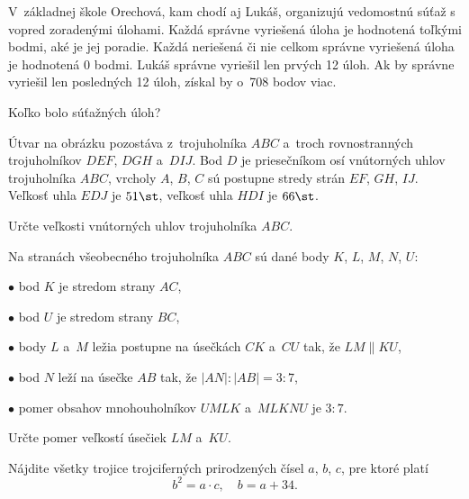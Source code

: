 {%
V~základnej škole Orechová, kam chodí aj Lukáš, organizujú vedomostnú súťaž s vopred zoradenými úlohami.
Každá správne vyriešená úloha je hodnotená toľkými bodmi, aké je jej poradie.
Každá neriešená či nie celkom správne vyriešená úloha je hodnotená 0 bodmi.
Lukáš správne vyriešil len prvých 12 úloh.
Ak by správne vyriešil len posledných 12 úloh, získal by o~708 bodov viac.

Koľko bolo súťažných úloh?}

{%
Útvar na obrázku pozostáva z~trojuholníka $ABC$ a~troch rovnostranných trojuholníkov $DEF$, $DGH$ a~$DIJ$.
Bod $D$ je priesečníkom osí vnútorných uhlov trojuholníka $ABC$, vrcholy $A$, $B$, $C$ sú postupne stredy strán $EF$, $GH$, $IJ$.
Veľkosť uhla $EDJ$ je $51\st$, veľkosť uhla $HDI$ je $66\st$.

Určte veľkosti vnútorných uhlov trojuholníka $ABC$.
%
}

{%
Na stranách všeobecného trojuholníka $ABC$ sú dané body $K$, $L$, $M$, $N$, $U$:
\item{$\bullet$} bod $K$ je stredom strany $AC$,
\item{$\bullet$} bod $U$ je stredom strany $BC$,
\item{$\bullet$} body $L$ a~$M$ ležia postupne na úsečkách $CK$ a~$CU$ tak, že $LM\parallel KU$,
\item{$\bullet$} bod $N$ leží na úsečke $AB$ tak, že $|AN|:|AB|=3:7$,
\item{$\bullet$} pomer obsahov mnohouholníkov $UMLK$ a~$MLKNU$ je $3:7$.

\noindent
Určte pomer veľkostí úsečiek $LM$ a~$KU$.}

{%
Nájdite všetky trojice trojciferných prirodzených čísel $a$, $b$, $c$, pre ktoré platí
$$
b^2 =a\cdot c, \quad b =a+34 .
$$}


